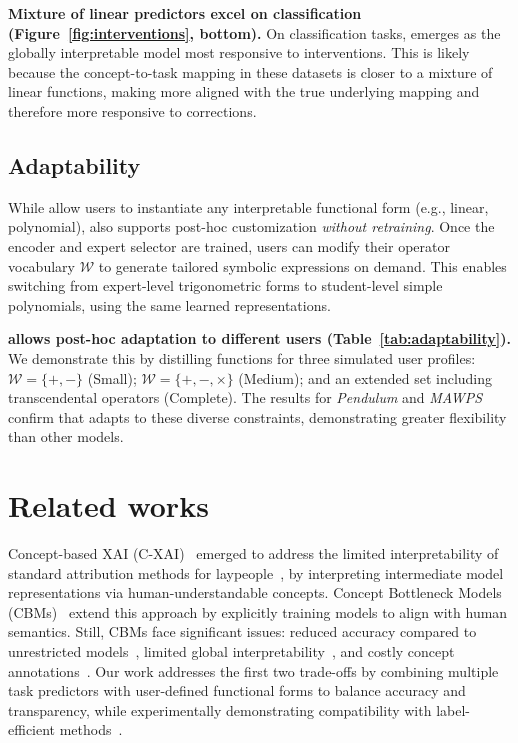 \documentclass{article}
\theoremstyle{plain}
\theoremstyle{definition}
\theoremstyle{remark}
\newcommand{\mypar}[1]{\noindent\textbf{#1}}
\begin{document}
\mypar{Mixture of linear predictors excel on classification (Figure~\ref{fig:interventions}, bottom).}
On classification tasks, \linearacro{} emerges as the globally interpretable model most responsive to interventions. This is likely because the concept-to-task mapping in these datasets is closer to a mixture of linear functions, making \linearacro{} more aligned with the true underlying mapping and therefore more responsive to corrections.

\subsection{Adaptability}
\label{sec:exp_adapt}


While \classacro{} allow users to instantiate any interpretable functional form (e.g., linear, polynomial), \symbolic{} also supports post-hoc customization \emph{without retraining}.
Once the encoder and expert selector are trained, users can modify their operator vocabulary $\mathcal{W}$ to generate tailored symbolic expressions on demand. This enables switching from expert-level trigonometric forms to student-level simple polynomials, using the same learned representations.  

\mypar{\symbolicacro{} allows post-hoc adaptation to different users (Table~\ref{tab:adaptability}).}
We demonstrate this by distilling functions for three simulated user profiles: $\mathcal{W}=\{+,-\}$ (Small); $\mathcal{W}=\{+,-,\times\}$ (Medium); and an extended set including transcendental operators (Complete). The results for \emph{Pendulum} and \emph{MAWPS} confirm that \symbolicacro{} adapts to these diverse constraints, demonstrating greater flexibility than other models. 

\section{Related works}

Concept-based XAI (C-XAI)~\citep{kim2018interpretability,poeta2023concept} emerged to address the limited interpretability of standard attribution methods for laypeople~\citep{rudin2019stop, kim2023help}, by interpreting intermediate model representations via human-understandable concepts. Concept Bottleneck Models (CBMs)~\citep{koh2020concept} extend this approach by explicitly training models to align with human semantics. Still, CBMs face significant issues: reduced accuracy compared to unrestricted models~\citep{debot2024interpretable}, limited global interpretability~\citep{barbiero2023,de2025}, and costly concept annotations~\citep{oikarinen2023label,debole2025if}. Our work addresses the first two trade-offs by combining multiple task predictors with user-defined functional forms to balance accuracy and transparency, while experimentally demonstrating compatibility with label-efficient methods~\citep{oikarinen2023label}.
\end{document}
